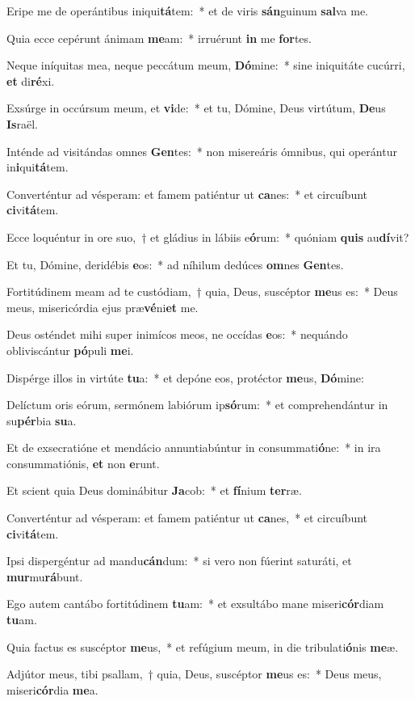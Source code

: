 \item Eripe me de operántibus iniqui\textbf{tá}tem:~* et de viris \textbf{sán}guinum \textbf{sal}va me.
\item Quia ecce cepérunt ánimam \textbf{me}am:~* irruérunt \textbf{in} me \textbf{for}tes.
\item Neque iníquitas mea, neque peccátum meum, \textbf{Dó}mine:~* sine iniquitáte cucúrri, \textbf{et} di\textbf{ré}xi.
\item Exsúrge in occúrsum meum, et \textbf{vi}de:~* et tu, Dómine, Deus virtútum, \textbf{De}us \textbf{Is}raël.
\item Inténde ad visitándas omnes \textbf{Gen}tes:~* non misereáris ómnibus, qui operántur in\textbf{i}qui\textbf{tá}tem.
\item Converténtur ad vésperam: et famem patiéntur ut \textbf{ca}nes:~* et circuíbunt \textbf{ci}vi\textbf{tá}tem.
\item Ecce loquéntur in ore suo,~† et gládius in lábiis e\textbf{ó}rum:~* quóniam \textbf{quis} au\textbf{dí}vit?
\item Et tu, Dómine, deridébis \textbf{e}os:~* ad níhilum dedúces \textbf{om}nes \textbf{Gen}tes.
\item Fortitúdinem meam ad te custódiam,~† quia, Deus, suscéptor \textbf{me}us es:~* Deus meus, misericórdia ejus præ\textbf{vé}ni\textbf{et} me.
\item Deus osténdet mihi super inimícos meos, ne occídas \textbf{e}os:~* nequándo obliviscántur \textbf{pó}puli \textbf{me}i.
\item Dispérge illos in virtúte \textbf{tu}a:~* et depóne eos, protéctor \textbf{me}us, \textbf{Dó}mine:
\item Delíctum oris eórum, sermónem labiórum ip\textbf{só}rum:~* et comprehendántur in su\textbf{pér}bia \textbf{su}a.
\item Et de exsecratióne et mendácio annuntiabúntur in consummati\textbf{ó}ne:~* in ira consummatiónis, \textbf{et} non \textbf{e}runt.
\item Et scient quia Deus dominábitur \textbf{Ja}cob:~* et \textbf{fí}nium \textbf{ter}ræ.
\item Converténtur ad vésperam: et famem patiéntur ut \textbf{ca}nes,~* et circuíbunt \textbf{ci}vi\textbf{tá}tem.
\item Ipsi dispergéntur ad mandu\textbf{cán}dum:~* si vero non fúerint saturáti, et \textbf{mur}mu\textbf{rá}bunt.
\item Ego autem cantábo fortitúdinem \textbf{tu}am:~* et exsultábo mane miseri\textbf{cór}diam \textbf{tu}am.
\item Quia factus es suscéptor \textbf{me}us,~* et refúgium meum, in die tribulati\textbf{ó}nis \textbf{me}æ.
\item Adjútor meus, tibi psallam,~† quia, Deus, suscéptor \textbf{me}us es:~* Deus meus, miseri\textbf{cór}dia \textbf{me}a.
